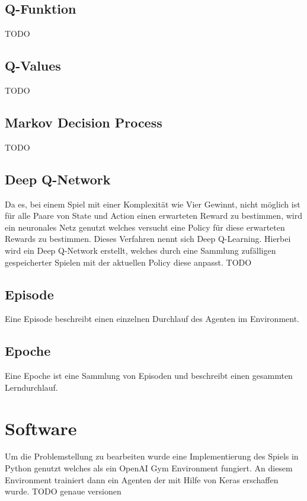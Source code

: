 \subsection{Q-Funktion}
\colorbox{red!30}{TODO} %

\subsection{Q-Values}
\colorbox{red!30}{TODO} %

\subsection{Markov Decision Process}
\colorbox{red!30}{TODO} %

\subsection{Deep Q-Network}
Da es, bei einem Spiel mit einer Komplexität wie Vier Gewinnt, nicht möglich ist für alle Paare von State und Action einen erwarteten Reward zu bestimmen, wird ein neuronales Netz genutzt welches versucht eine Policy für diese erwarteten Rewards zu bestimmen. Dieses Verfahren nennt sich Deep Q-Learning. Hierbei wird ein Deep Q-Network erstellt, welches durch eine Sammlung zufälligen gespeicherter Spielen mit der aktuellen Policy diese anpasst.
\colorbox{red!30}{TODO} %

\subsection{Episode}
Eine Episode beschreibt einen einzelnen Durchlauf des Agenten im Environment.

\subsection{Epoche}
Eine Epoche ist eine Sammlung von Episoden und beschreibt einen gesammten Lerndurchlauf.









\section{Software}
Um die Problemstellung zu bearbeiten wurde eine Implementierung des Spiels in Python genutzt welches als ein OpenAI Gym Environment fungiert. An diesem Environment trainiert dann ein Agenten der mit Hilfe von  Keras erschaffen wurde.
\colorbox{red!30}{TODO genaue versionen}

